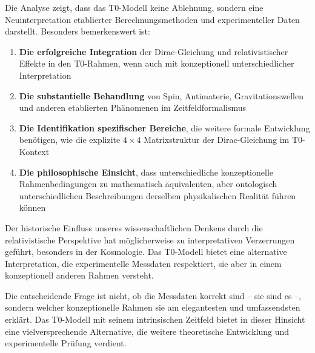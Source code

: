 \documentclass[12pt,a4paper]{article}
\begin{document}
	Die Analyse zeigt, dass das T0-Modell keine Ablehnung, sondern eine Neuinterpretation etablierter Berechnungsmethoden und experimenteller Daten darstellt. Besonders bemerkenswert ist:
	
	\begin{enumerate}
		\item \textbf{Die erfolgreiche Integration} der Dirac-Gleichung und relativistischer Effekte in den T0-Rahmen, wenn auch mit konzeptionell unterschiedlicher Interpretation
		
		\item \textbf{Die substantielle Behandlung} von Spin, Antimaterie, Gravitationswellen und anderen etablierten Phänomenen im Zeitfeldformalismus
		
		\item \textbf{Die Identifikation spezifischer Bereiche}, die weitere formale Entwicklung benötigen, wie die explizite $4 \times 4$ Matrixstruktur der Dirac-Gleichung im T0-Kontext
		
		\item \textbf{Die philosophische Einsicht}, dass unterschiedliche konzeptionelle Rahmenbedingungen zu mathematisch äquivalenten, aber ontologisch unterschiedlichen Beschreibungen derselben physikalischen Realität führen können
	\end{enumerate}
	
	Der historische Einfluss unseres wissenschaftlichen Denkens durch die relativistische Perspektive hat möglicherweise zu interpretativen Verzerrungen geführt, besonders in der Kosmologie. Das T0-Modell bietet eine alternative Interpretation, die experimentelle Messdaten respektiert, sie aber in einem konzeptionell anderen Rahmen versteht.
	
	Die entscheidende Frage ist nicht, ob die Messdaten korrekt sind – sie sind es –, sondern welcher konzeptionelle Rahmen sie am elegantesten und umfassendsten erklärt. Das T0-Modell mit seinem intrinsischen Zeitfeld bietet in dieser Hinsicht eine vielversprechende Alternative, die weitere theoretische Entwicklung und experimentelle Prüfung verdient.
	
\end{document}
